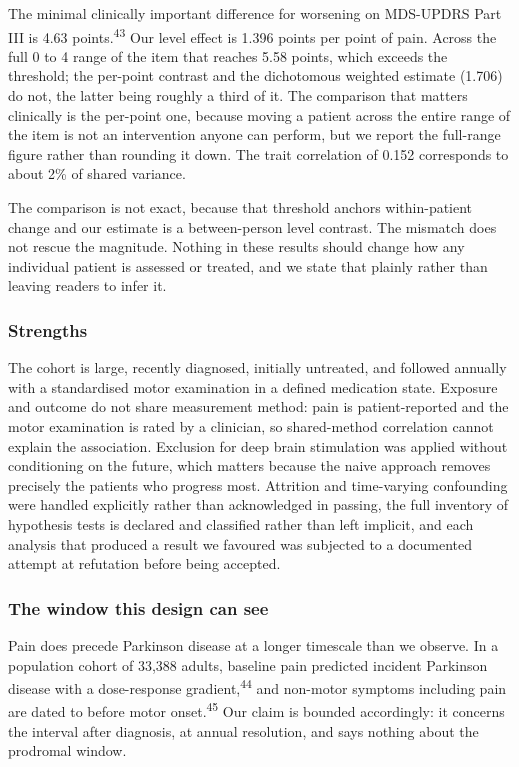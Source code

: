 \documentclass[
  english,
  12pt,
]{article}
\begin{document}
The minimal clinically important difference for worsening on MDS-UPDRS Part III is 4.63 points.\textsuperscript{43} Our level effect is 1.396 points per point of pain. Across the full 0 to 4 range of the item that reaches 5.58 points, which exceeds the threshold; the per-point contrast and the dichotomous weighted estimate (1.706) do not, the latter being roughly a third of it. The comparison that matters clinically is the per-point one, because moving a patient across the entire range of the item is not an intervention anyone can perform, but we report the full-range figure rather than rounding it down. The trait correlation of 0.152 corresponds to about 2\% of shared variance.

The comparison is not exact, because that threshold anchors within-patient change and our estimate is a between-person level contrast. The mismatch does not rescue the magnitude. Nothing in these results should change how any individual patient is assessed or treated, and we state that plainly rather than leaving readers to infer it.

\subsubsection{Strengths}\label{strengths}

The cohort is large, recently diagnosed, initially untreated, and followed annually with a standardised motor examination in a defined medication state. Exposure and outcome do not share measurement method: pain is patient-reported and the motor examination is rated by a clinician, so shared-method correlation cannot explain the association. Exclusion for deep brain stimulation was applied without conditioning on the future, which matters because the naive approach removes precisely the patients who progress most. Attrition and time-varying confounding were handled explicitly rather than acknowledged in passing, the full inventory of hypothesis tests is declared and classified rather than left implicit, and each analysis that produced a result we favoured was subjected to a documented attempt at refutation before being accepted.

\subsubsection{The window this design can see}\label{the-window-this-design-can-see}

Pain does precede Parkinson disease at a longer timescale than we observe. In a population cohort of 33,388 adults, baseline pain predicted incident Parkinson disease with a dose-response gradient,\textsuperscript{44} and non-motor symptoms including pain are dated to before motor onset.\textsuperscript{45} Our claim is bounded accordingly: it concerns the interval after diagnosis, at annual resolution, and says nothing about the prodromal window.
\end{document}
